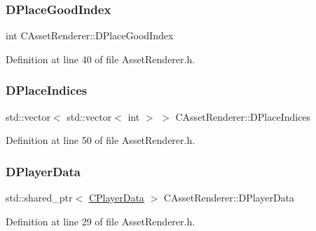 \subsubsection{\texorpdfstring{D\+Place\+Good\+Index}{DPlaceGoodIndex}}
{\footnotesize\ttfamily int C\+Asset\+Renderer\+::\+D\+Place\+Good\+Index\hspace{0.3cm}{\ttfamily [protected]}}



Definition at line 40 of file Asset\+Renderer.\+h.

\hypertarget{classCAssetRenderer_a5d20fe39b33a35847b7332b46cfbf3c6}{}\label{classCAssetRenderer_a5d20fe39b33a35847b7332b46cfbf3c6} 
\subsubsection{\texorpdfstring{D\+Place\+Indices}{DPlaceIndices}}
{\footnotesize\ttfamily std\+::vector$<$ std\+::vector$<$ int $>$ $>$ C\+Asset\+Renderer\+::\+D\+Place\+Indices\hspace{0.3cm}{\ttfamily [protected]}}



Definition at line 50 of file Asset\+Renderer.\+h.

\hypertarget{classCAssetRenderer_ae0f36013db2ef04b08b74d92249c1af5}{}\label{classCAssetRenderer_ae0f36013db2ef04b08b74d92249c1af5} 
\subsubsection{\texorpdfstring{D\+Player\+Data}{DPlayerData}}
{\footnotesize\ttfamily std\+::shared\+\_\+ptr$<$ \hyperlink{classCPlayerData}{C\+Player\+Data} $>$ C\+Asset\+Renderer\+::\+D\+Player\+Data\hspace{0.3cm}{\ttfamily [protected]}}



Definition at line 29 of file Asset\+Renderer.\+h.

\hypertarget{classCAssetRenderer_a422a3f7e4202e73431fba7036e494dfe}{}\label{classCAssetRenderer_a422a3f7e4202e73431fba7036e494dfe} 
